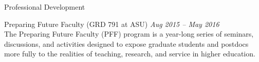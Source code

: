 \begin{rBulletSection}{Professional Development}

    \item Preparing Future Faculty (GRD 791 at ASU) \hfill \emph{Aug 2015 -- May 2016}\\
    The Preparing Future Faculty (PFF) program is a year-long series of seminars, discussions, and activities designed to expose graduate students and postdocs more fully to the realities of teaching, research, and service in higher education.


\end{rBulletSection}
